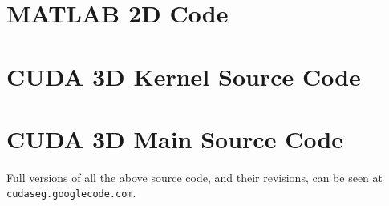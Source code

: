 \appendix
\chapter{MATLAB 2D Code}

\lstset{language=matlab,basicstyle=\footnotesize}


\chapter{CUDA 3D Kernel Source Code}
\lstset{language=c,basicstyle=\footnotesize}


\newpage
\chapter{CUDA 3D Main Source Code}
\lstset{language=c,basicstyle=\footnotesize}



\begin{center}
	Full versions of all the above source code, and their revisions, can be seen at\\
\texttt{cudaseg.googlecode.com}.
\end{center}
